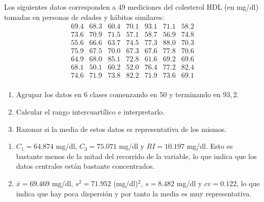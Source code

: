 {Los siguientes datos corresponden a 49 mediciones del colesterol HDL (en mg/dl) tomadas en personas de edades y hábitos similares:
\[
\begin{array}{ccccccc}
69.4 & 68.3 & 60.4 & 70.1 & 93.1 & 71.1 & 58.2 \\
73.6 & 70.9 & 71.5 & 57.1 & 58.7 & 56.9 & 74.8 \\
55.6 & 66.6 & 63.7 & 74.5 & 77.3 & 88.0 & 70.3 \\
75.9 & 67.5 & 70.0 & 67.3 & 67.6 & 77.8 & 70.6 \\
64.9 & 68.0 & 85.1 & 72.8 & 61.6 & 69.2 & 69.6 \\
68.1 & 50.1 & 60.2 & 52.0 & 76.4 & 77.2 & 82.4 \\
74.6 & 71.9 & 73.8 & 82.2 & 71.9 & 73.6 & 69.1 \\
\end{array}
\]
\begin{enumerate}
\item Agrupar los datos en 6 clases comenzando en 50 y terminando en $93,2$.
\item Calcular el rango intercuartílico e interpretarlo.
\item Razonar si la media de estos datos es representativa de los mismos.
\end{enumerate}
}
{\begin{enumerate}[start=2]
\item $C_1=64.874$ mg/dl, $C_3=75.071$ mg/dl y $RI=10.197$ mg/dl. Esto es bastante menos de la mitad del recorrido de la variable, lo que indica que los datos centrales están bastante concentrados.
\item $\bar x= 69.469$ mg/dl, $s^2=71.952$ (mg/dl)$^2$, $s=8.482$ mg/dl y $cv=0.122$, lo que indica que hay poca dispersión y por tanto la media es muy representativa.
\end{enumerate}
}
{}


